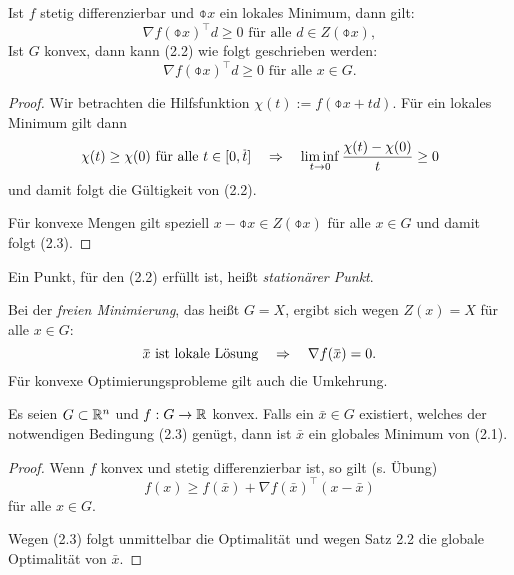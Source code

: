 \begin{aus}
  Ist $f$ stetig differenzierbar und $\obar{x}$ ein lokales Minimum, dann gilt:
  \begin{equation}
    \nabla f(\obar{x})^\top d \ge 0 \text{ für alle } d \in Z(\obar{x}),
  \end{equation}
  Ist $G$ konvex, dann kann (2.2) wie folgt geschrieben werden:
  \begin{equation}
    \nabla f(\obar{x})^\top d \ge 0 \text{ für alle } x \in G.
  \end{equation}
\end{aus}

\begin{proof}
  Wir betrachten die Hilfsfunktion $\chi(t) := f( \obar{x} + td)$. Für ein lokales
  Minimum gilt dann
  \[ \chi(t) \ge \chi(0) \text{ für alle } t \in [0,\obar{t}]
    \qRq
    \liminf_{t \to 0} \frac{\chi(t) - \chi(0)}{t} \ge 0 \]
  und damit folgt die Gültigkeit von (2.2).

  Für konvexe Mengen gilt speziell $x - \obar{x} \in Z(\obar{x})$ für alle $x
  \in G$ und damit folgt (2.3).
\end{proof}

\begin{rmrk}
  Ein Punkt, für den (2.2) erfüllt ist, heißt \emph{stationärer Punkt}.
\end{rmrk}

\begin{rmrk} %
  Bei der \emph{freien Minimierung}, das heißt $G = X$, ergibt sich wegen $Z(x)
  = X$ für alle $x \in G$:
  \[ \obar{x} \text{ ist lokale Lösung} \qRq \nabla f(\obar{x}) = 0. \]
  Für konvexe Optimierungsprobleme gilt auch die Umkehrung.
\end{rmrk}

\begin{aus}
  Es seien $G \subset \mathbb{R}^n$ und $f: G \to \mathbb{R}$ konvex. Falls ein $\bar{x}
  \in G$ existiert, welches der notwendigen Bedingung (2.3) genügt, dann ist
  $\bar{x}$ ein globales Minimum von (2.1).
\end{aus}

\begin{proof}
  Wenn $f$ konvex und stetig differenzierbar ist, so gilt (s. Übung)
  \[ f(x) \ge f( \bar{x} ) + \nabla f( \bar{x} )^\top (x - \bar{x}) \]
  für alle $x \in G$.

  Wegen (2.3) folgt unmittelbar die Optimalität und wegen Satz 2.2 die globale
  Optimalität von $\bar{x}$.
\end{proof}

